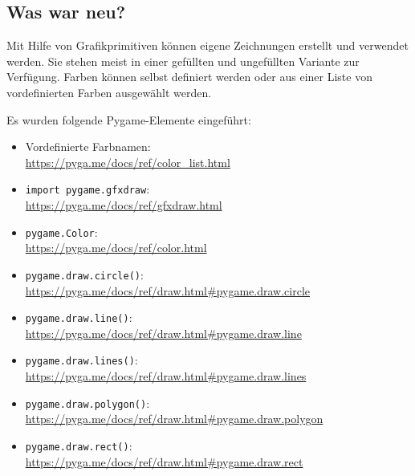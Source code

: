 

\subsection*{Was war neu?}

Mit Hilfe von Grafikprimitiven können eigene Zeichnungen erstellt und verwendet werden. Sie stehen meist in einer gefüllten und ungefüllten Variante zur Verfügung. Farben können selbst definiert werden oder aus einer Liste von vordefinierten Farben ausgewählt werden. 

Es wurden folgende Pygame-Elemente eingeführt:

\begin{itemize}
	\item Vordefinierte Farbnamen:\\ 
	\url{https://pyga.me/docs/ref/color_list.html}

	\item \texttt{import pygame.gfxdraw}:\\ \url{https://pyga.me/docs/ref/gfxdraw.html}
	
	\item \texttt{pygame.Color}:
	\\
	\url{https://pyga.me/docs/ref/color.html}
	
	\item \texttt{pygame.draw.circle()}:
	\\
	\url{https://pyga.me/docs/ref/draw.html#pygame.draw.circle}
	
	\item \texttt{pygame.draw.line()}:
	\\
	\url{https://pyga.me/docs/ref/draw.html#pygame.draw.line}
	
	\item \texttt{pygame.draw.lines()}:
	\\
	\url{https://pyga.me/docs/ref/draw.html#pygame.draw.lines}
	
	\item \texttt{pygame.draw.polygon()}:
	\\
	\url{https://pyga.me/docs/ref/draw.html#pygame.draw.polygon}
	
	\item \texttt{pygame.draw.rect()}:
	\\
	\url{https://pyga.me/docs/ref/draw.html#pygame.draw.rect}
	

\end{itemize}
